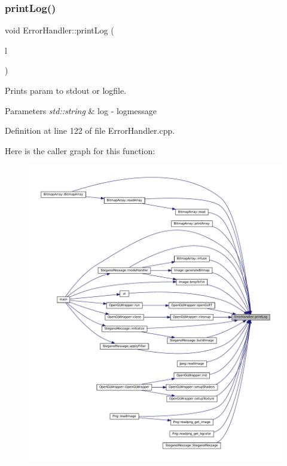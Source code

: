 \subsubsection{\texorpdfstring{printLog()}{printLog()}}
{\footnotesize\ttfamily void Error\+Handler\+::print\+Log (\begin{DoxyParamCaption}\item[{std\+::string}]{l }\end{DoxyParamCaption})}



Prints param to stdout or logfile. 


\begin{DoxyParams}{Parameters}
{\em std\+::string} & log -\/ logmessage \\
\hline
\end{DoxyParams}


Definition at line 122 of file Error\+Handler.\+cpp.

Here is the caller graph for this function\+:\nopagebreak
\begin{figure}[H]
\begin{center}
\leavevmode
\includegraphics[width=350pt]{classErrorHandler_a5ef18327a559b8d77be496dad6a2bf52_icgraph}
\end{center}
\end{figure}
\mbox{\label{classErrorHandler_aa79cfd994939c238b85ad021ea6bbe05}} 
